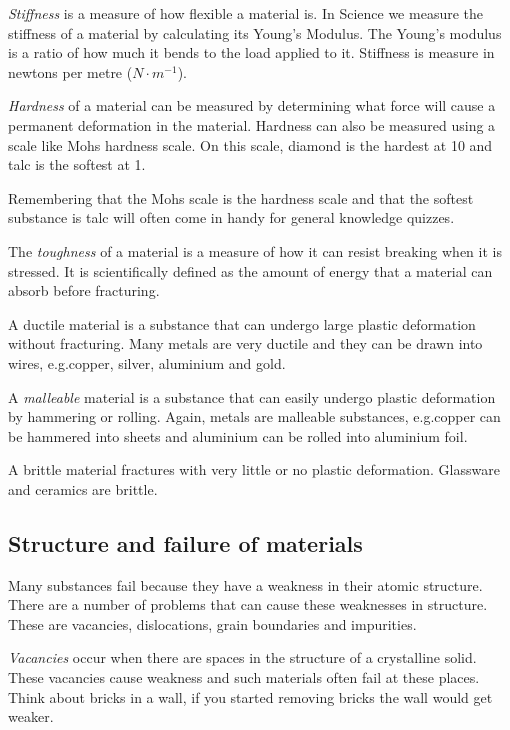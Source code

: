 \emph{Stiffness} is a measure of how flexible a material is. In Science we measure the stiffness of a material by calculating its Young's Modulus. The Young's modulus is a ratio of how much it bends to the load applied to it. Stiffness is measure in newtons per metre ($N \cdot m^{-1}$).
 
\emph{Hardness} of a material can be measured by determining what force will cause a permanent deformation in the material. Hardness can also be measured using a scale like Mohs hardness scale. On this scale, diamond is the hardest at 10 and talc is the softest at 1.

\begin{IFact}{Remembering that the Mohs scale is the hardness scale and that the softest substance is talc will often come in handy for general knowledge quizzes.}\end{IFact}

The \emph{toughness} of a material is a measure of how it can resist breaking when it is stressed. It is scientifically defined as the amount of energy that a material can absorb before fracturing.

A ductile material is a substance that can undergo large plastic deformation without fracturing. Many metals are very ductile and they can be drawn into wires, e.g.\@ copper, silver, aluminium and gold.

A \emph{malleable} material is a substance that can easily undergo plastic deformation by hammering or rolling. Again, metals are malleable substances, e.g.\@ copper can be hammered into sheets and aluminium can be rolled into aluminium foil.
 
A brittle material fractures with very little or no plastic deformation. Glassware and ceramics are brittle.

\subsection{Structure and failure of materials}

Many substances fail because they have a weakness in their atomic structure. There are a number of problems that can cause these weaknesses in structure. These are vacancies, dislocations, grain boundaries and impurities.

\emph{Vacancies} occur when there are spaces in the structure of a crystalline solid. These vacancies cause weakness and such materials often fail at these places. Think about bricks in a wall, if you started removing bricks the wall would get weaker.

